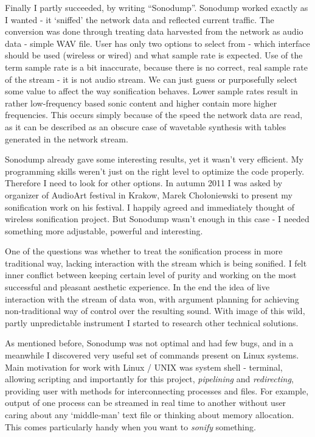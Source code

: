 \documentclass[11pt,a4paper,oneside]{report}
\begin{document}
Finally I partly succeeded, by writing ``Sonodump''. Sonodump worked exactly as I wanted - it `sniffed' the network data and reflected current traffic. The conversion was done through treating data harvested from the network as audio data - simple WAV file. User has only two options to select from - which interface should be used (wireless or wired) and what sample rate is expected. Use of the term sample rate is a bit inaccurate, because there is no correct, real sample rate of the stream - it is not audio stream. We can just guess or purposefully select some value to affect the way sonification behaves. Lower sample rates result in rather low-frequency based sonic content and higher contain more higher frequencies. This occurs simply because of the speed the network data are read, as it can be described as an obscure case of wavetable synthesis with tables generated in the network stream.

Sonodump already gave some interesting results, yet it wasn't very efficient. My programming skills weren't just on the right level to optimize the code properly. Therefore I need to look for other options. In autumn 2011 I was asked by organizer of AudioArt festival in Krakow, Marek Chołoniewski to present my sonification work on his festival. I happily agreed and immediately thought of wireless sonification project. But Sonodump wasn't enough in this case - I needed something more adjustable, powerful and interesting.

One of the questions was whether to treat the sonification process in more traditional way, lacking interaction with the stream which is being sonified. I felt inner conflict between keeping certain level of purity and working on the most successful and pleasant aesthetic experience. In the end the idea of live interaction with the stream of data won, with argument planning for achieving non-traditional way of control over the resulting sound. With image of this wild, partly unpredictable instrument I started to research other technical solutions.

As mentioned before, Sonodump was not optimal and had few bugs, and in a meanwhile I discovered very useful set of commands present on Linux systems. Main motivation for work with Linux / UNIX was system shell - terminal, allowing scripting and importantly for this project, \textit{pipelining} and \textit{redirecting}, providing user with methods for interconnecting processes and files. For example, output of one process can be streamed in real time to another without user caring about any `middle-man' text file or thinking about memory allocation. This comes particularly handy when you want to \textit{sonify} something. 
\end{document}
